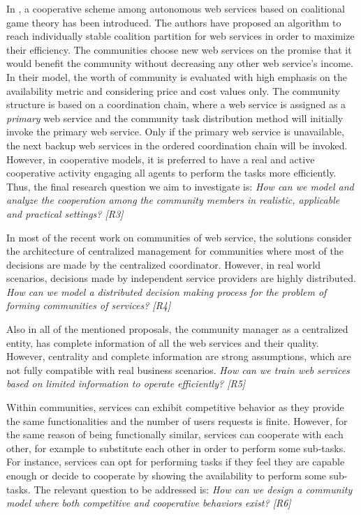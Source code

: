 In \cite{10.1109/TSC.2012.12}, a cooperative scheme among
autonomous web services based on coalitional game theory has been
introduced. The authors have proposed an algorithm to reach
individually stable coalition partition for web services in order
to maximize their efficiency. The communities choose new web
services on the promise that it would benefit the community
without decreasing any other web service's income. In their model,
the worth of community is evaluated with high emphasis on the
availability metric and considering price and cost values only.
The community structure is based on a coordination chain, where a
web service is assigned as a \emph{primary} web service and the
community task distribution method will initially invoke the
primary web service. Only if the primary web service is
unavailable, the next backup web services in the ordered
coordination chain will be invoked. However, in cooperative
models, it is preferred to have a real and active cooperative
activity engaging all agents to perform the tasks more
efficiently. Thus, the final research question we aim to investigate is: \emph{How can we model and analyze the cooperation
among the community members in realistic, applicable and practical
settings? [R3]}

In most of the recent work on communities of web service, the solutions consider the architecture of centralized management for communities where most of the decisions are made by the centralized coordinator. However, in real world scenarios, decisions made by independent service providers are highly distributed.  \emph{How can we model a distributed decision making process for the problem of forming communities of services? [R4]}

Also in all of the mentioned proposals, the community manager as a centralized entity, has complete information of all the web services and their quality. However, centrality and complete information are strong assumptions, which are not fully compatible with real business scenarios.
\emph{How can we train web services based on limited information to operate efficiently? [R5]}

Within communities, services can exhibit competitive behavior as they provide the same functionalities and the number of users requests is finite.
However, for the same reason of being functionally similar, services can cooperate with each other, for example to substitute each other in order to perform some sub-tasks.
For instance, services can opt for performing tasks if they feel they are capable enough
or decide to cooperate by showing the availability to perform some sub-tasks. The relevant question to be addressed is: \emph{How can we design a community model where both competitive and cooperative behaviors exist? [R6]}

